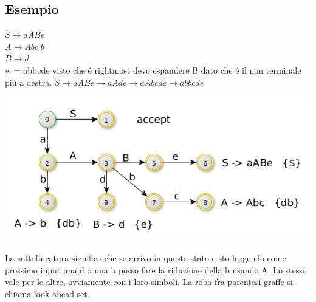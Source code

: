 \subsection{Esempio}
$S \rightarrow aABe$\\
$A \rightarrow Abc|b$\\
$B \rightarrow d$\\

w = abbcde visto che \'e rightmost devo espandere B dato che \'e il non terminale pi\'u a destra.
$S \rightarrow aABe \rightarrow aAde \rightarrow aAbcde \rightarrow abbcde $\\

\begin{center}
    \includegraphics[scale=0.6]{Chapters/Img/c02_14.png}\\
\end{center} 

La sottolineatura significa che se arrivo in questo stato e sto leggendo come prossimo input una d o una b posso fare la riduzione della b usando A. Lo stesso vale per le altre, ovviamente con i loro simboli.
La roba fra parentesi graffe si chiama look-ahead set.

